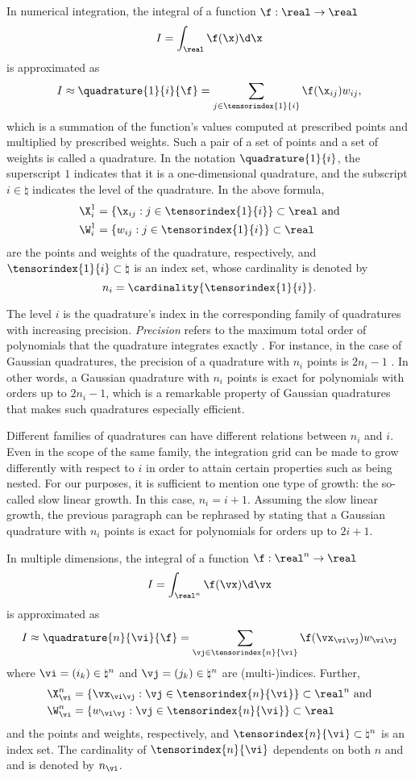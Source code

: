 In numerical integration, the integral of a function $\f: \real \to \real$
\[
  I = \int_\real \f(\x) \d \x
\]
is approximated as
\[
  I \approx \quadrature{1}{i}{\f}
  = \sum_{j \in \tensorindex{1}{i}} \f(\x_{ij}) w_{ij},
\]
which is a summation of the function's values computed at prescribed points and
multiplied by prescribed weights. Such a pair of a set of points and a set of
weights is called a quadrature. In the notation $\quadrature{1}{i}$, the
superscript $1$ indicates that it is a one-dimensional quadrature, and the
subscript $i \in \natural$ indicates the level of the quadrature. In the above
formula,
\begin{align*}
  & \X^1_i = \{ \x_{ij}: j \in \tensorindex{1}{i} \} \subset \real \text{ and} \\
  & \W^1_i = \{ w_{ij}: j \in \tensorindex{1}{i} \} \subset \real
\end{align*}
are the points and weights of the quadrature, respectively, and
$\tensorindex{1}{i} \subset \natural$ is an index set, whose cardinality is
denoted by
\[
  n_i = \cardinality{\tensorindex{1}{i}}.
\]

The level $i$ is the quadrature's index in the corresponding family of
quadratures with increasing precision. \emph{Precision} refers to the maximum
total order of polynomials that the quadrature integrates exactly
\cite{heiss2008}. For instance, in the case of Gaussian quadratures, the
precision of a quadrature with $n_i$ points is $2 n_i - 1$ \cite{heiss2008}. In
other words, a Gaussian quadrature with $n_i$ points is exact for polynomials
with orders up to $2 n_i - 1$, which is a remarkable property of Gaussian
quadratures that makes such quadratures especially efficient.

Different families of quadratures can have different relations between $n_i$ and
$i$. Even in the scope of the same family, the integration grid can be made to
grow differently with respect to $i$ in order to attain certain properties such
as being nested. For our purposes, it is sufficient to mention one type of
growth: the so-called slow linear growth. In this case, $n_i = i + 1$. Assuming
the slow linear growth, the previous paragraph can be rephrased by stating that
a Gaussian quadrature with $n_i$ points is exact for polynomials for orders up
to $2 i + 1$.

In multiple dimensions, the integral of a function $\f: \real^n \to \real$
\[
  I = \int_{\real^n} \f(\vx) \d \vx
\]
is approximated as
\[
  I \approx \quadrature{n}{\vi}{\f}
  = \sum_{\vj \in \tensorindex{n}{\vi}} \f(\vx_{\vi \vj}) w_{\vi \vj}
\]
where $\vi = (i_k) \in \natural^n$ and $\vj = (j_k) \in \natural^n$ are
(multi-)indices. Further,
\begin{align*}
  & \X^n_{\vi} = \{ \vx_{\vi \vj}: \vj \in \tensorindex{n}{\vi} \} \subset \real^n \text{ and} \\
  & \W^n_{\vi} = \{ w_{\vi \vj}: \vj \in \tensorindex{n}{\vi} \} \subset \real
\end{align*}
and the points and weights, respectively, and $\tensorindex{n}{\vi} \subset
\natural^n$ is an index set. The cardinality of $\tensorindex{n}{\vi}$
dependents on both $n$ and \vi and is denoted by $n_{\vi}$.

